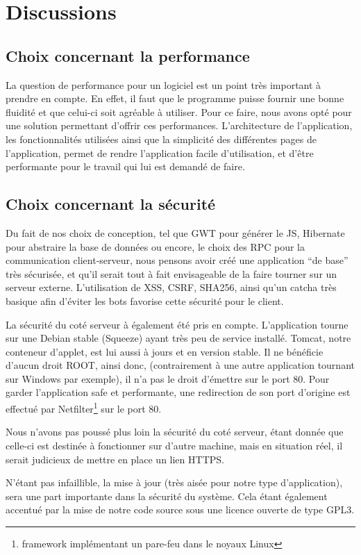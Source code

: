 \chapter{Discussions}
\section{Choix concernant la performance}
La question de performance pour un logiciel est un point très important à prendre en compte. En effet, il faut que le programme puisse fournir une bonne fluidité et que celui-ci soit agréable à utiliser. Pour ce faire, nous avons opté pour une solution permettant d'offrir ces performances. L'architecture de l'application, les fonctionnalités utilisées ainsi que la simplicité des différentes pages de l'application, permet de rendre l'application facile d'utilisation, et d'être performante pour le travail qui lui est demandé de faire.
\section{Choix concernant la sécurité}


Du fait de nos choix de conception, tel que GWT pour générer le JS, Hibernate pour abstraire la base de données ou encore, le choix des RPC pour la
communication client-serveur, nous pensons avoir créé une application \enquote{de base} très sécurisée, et qu'il serait tout à fait envisageable de la faire tourner sur un serveur externe.
L'utilisation de XSS, CSRF, SHA256, ainsi qu'un catcha très basique afin d'éviter les bots favorise cette sécurité pour le client.


La sécurité du coté serveur à également été pris en compte. L'application tourne sur une Debian stable (Squeeze) ayant très peu de service installé. Tomcat, notre conteneur d'applet, est lui aussi à jours et en version stable. Il ne bénéficie d'aucun droit ROOT, ainsi donc, (contrairement à une autre application tournant sur Windows par exemple), il n'a pas le droit d'émettre sur le port 80. Pour garder l'application safe et performante, une redirection de son port d'origine est effectué par Netfilter\footnote{framework implémentant un pare-feu dans le noyaux Linux} sur le port 80.

Nous n'avons pas poussé plus loin la sécurité du coté serveur, étant donnée que celle-ci est destinée à fonctionner sur d'autre machine, mais en situation réel, il serait judicieux de mettre en place un lien HTTPS.

N'étant pas infaillible, la mise à jour (très aisée pour notre type d'application), sera une part importante dans la sécurité du système. Cela étant également accentué par la mise de notre code source sous une licence ouverte de type GPL3.
